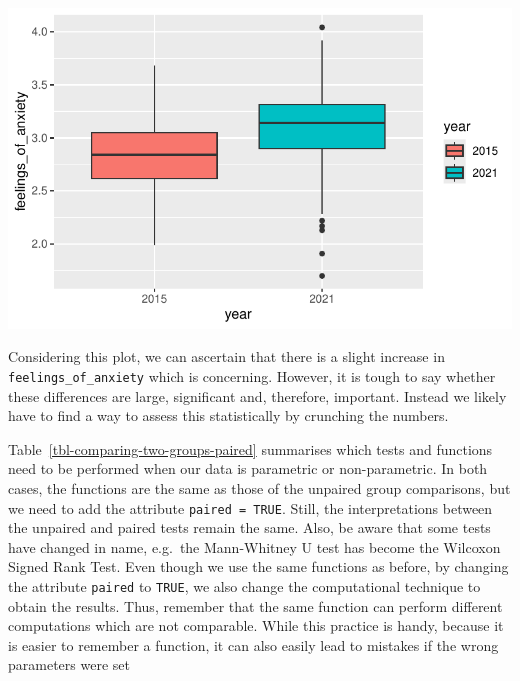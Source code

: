 \documentclass[
  letterpaper,
  DIV=11,
  numbers=noendperiod]{scrreprt}
\begin{document}
\includegraphics{11_group_comparison_files/figure-pdf/two-paired-groups-boxplot-1.pdf}

Considering this plot, we can ascertain that there is a slight increase
in \texttt{feelings\_of\_anxiety} which is concerning. However, it is
tough to say whether these differences are large, significant and,
therefore, important. Instead we likely have to find a way to assess
this statistically by crunching the numbers.

Table~\ref{tbl-comparing-two-groups-paired} summarises which tests and
functions need to be performed when our data is parametric or
non-parametric. In both cases, the functions are the same as those of
the unpaired group comparisons, but we need to add the attribute
\texttt{paired\ =\ TRUE}. Still, the interpretations between the
unpaired and paired tests remain the same. Also, be aware that some
tests have changed in name, e.g.~the Mann-Whitney U test has become the
Wilcoxon Signed Rank Test. Even though we use the same functions as
before, by changing the attribute \texttt{paired} to \texttt{TRUE}, we
also change the computational technique to obtain the results. Thus,
remember that the same function can perform different computations which
are not comparable. While this practice is handy, because it is easier
to remember a function, it can also easily lead to mistakes if the wrong
parameters were set
\end{document}
